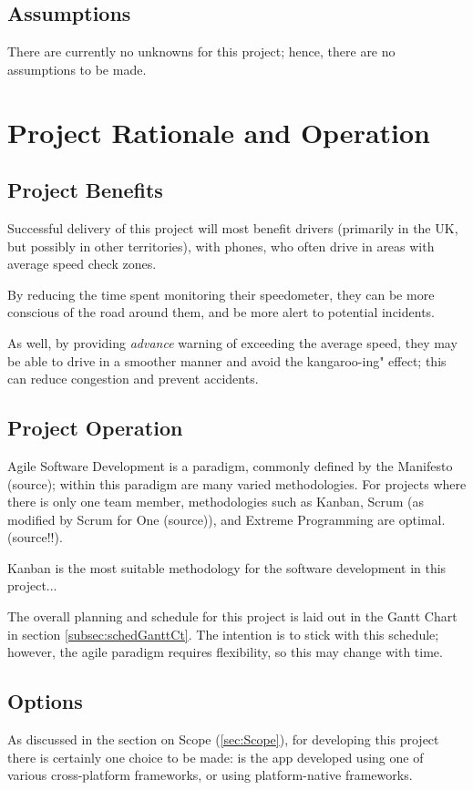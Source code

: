 \documentclass[11pt, a4paper, notitlepage]{report}
\begin{document}
\section{Assumptions}
There are currently no unknowns for this project; hence, there are no 
assumptions to be made.

\chapter{Project Rationale and Operation}
\section{Project Benefits}
Successful delivery of this project will most benefit drivers (primarily in the 
UK, but possibly in other territories), with phones, who often drive in areas 
with average speed check zones. 

By reducing the time spent monitoring their speedometer, they can be more 
conscious of the road around them, and be more alert to potential incidents.

As well, by providing \textit{advance} warning of exceeding the average speed, 
they may be able to drive in a smoother manner and avoid the kangaroo-ing" 
effect; this can reduce congestion and prevent accidents.

\section{Project Operation}\label{sec:projectOperation}
Agile Software Development is a paradigm, commonly defined by the Manifesto 
(source); within this paradigm are many varied methodologies. For projects 
where there is only one team member, methodologies such as Kanban, 
Scrum (as modified by Scrum for One (source)), and Extreme Programming are 
optimal. (source!!).

Kanban is the most suitable methodology for the software development in this 
project...%

The overall planning and schedule for this project is laid out in the Gantt 
Chart in section \ref{subsec:schedGanttCt}. The intention is to stick with this 
schedule; however, the agile paradigm requires flexibility, so this may change 
with time.

\section{Options}
As discussed in the section on Scope (\ref{sec:Scope}), for developing this 
project there is certainly one choice to be made: is the app developed using 
one of various cross-platform frameworks, or using platform-native frameworks.
\end{document}

